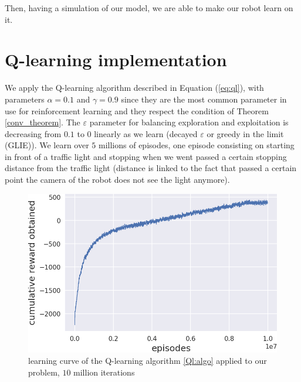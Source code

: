 \documentclass[14pt,a4paper]{article}
\theoremstyle{definition}
\begin{document}
Then, having a simulation of our model, we are able to make our robot learn on it.



\section{Q-learning implementation}


We apply the Q-learning algorithm described in Equation (\ref{eq:ql}), with parameters $\alpha = 0.1$ and $\gamma = 0.9$ since they are the most common parameter in use for reinforcement learning and they respect the condition of Theorem \ref{conv_theorem}. The $\varepsilon$ parameter for balancing exploration and exploitation is decreasing from $0.1$ to $0$ linearly as we learn (decayed $\varepsilon$ or greedy in the limit (GLIE)). We learn over $5$ millions of episodes, one episode consisting on starting in front of a traffic light and stopping when we went passed a certain stopping distance from the traffic light (distance is linked to the fact that passed a certain point the camera of the robot does not see the light anymore).


\begin{figure}[h]
\centering
\captionsetup{justification=centering}
\includegraphics[scale=0.6]{img/Q-learning-curve.png}
\caption{learning curve of the Q-learning algorithm \ref{Ql:algo} applied to our problem, $10$ million iterations}
\label{curve}
\end{figure}
\end{document}

